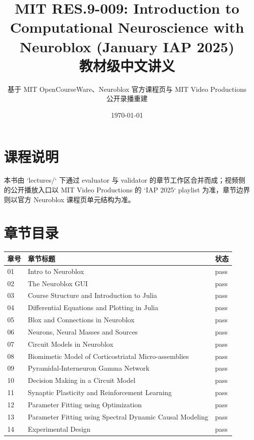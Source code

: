 \documentclass[a4paper]{article}
\title{MIT RES.9-009: Introduction to Computational Neuroscience with Neuroblox (January IAP 2025)\\教材级中文讲义}
\author{基于 MIT OpenCourseWare、Neuroblox 官方课程页与 MIT Video Productions 公开录播重建}
\date{\today}
\begin{document}
\maketitle
\tableofcontents
\newpage
\section*{课程说明}
本书由 `lectures/` 下通过 evaluator 与 validator 的章节工作区合并而成；视频侧的公开播放入口以 MIT Video Productions 的 `IAP 2025` playlist 为准，章节边界则以官方 Neuroblox 课程页单元结构为准。


\section*{章节目录}
\begin{longtable}{p{}p{}p{}}
\textbf{章号} & \textbf{章节标题} & \textbf{状态}\\
\hline
01 & Intro to Neuroblox & pass\\
02 & The Neuroblox GUI & pass\\
03 & Course Structure and Introduction to Julia & pass\\
04 & Differential Equations and Plotting in Julia & pass\\
05 & Blox and Connections in Neuroblox & pass\\
06 & Neurons, Neural Masses and Sources & pass\\
07 & Circuit Models in Neuroblox & pass\\
08 & Biomimetic Model of Corticostriatal Micro-assemblies & pass\\
09 & Pyramidal-Interneuron Gamma Network & pass\\
10 & Decision Making in a Circuit Model & pass\\
11 & Synaptic Plasticity and Reinforcement Learning & pass\\
12 & Parameter Fitting using Optimization & pass\\
13 & Parameter Fitting using Spectral Dynamic Causal Modeling & pass\\
14 & Experimental Design & pass\\
\end{longtable}
\end{document}
